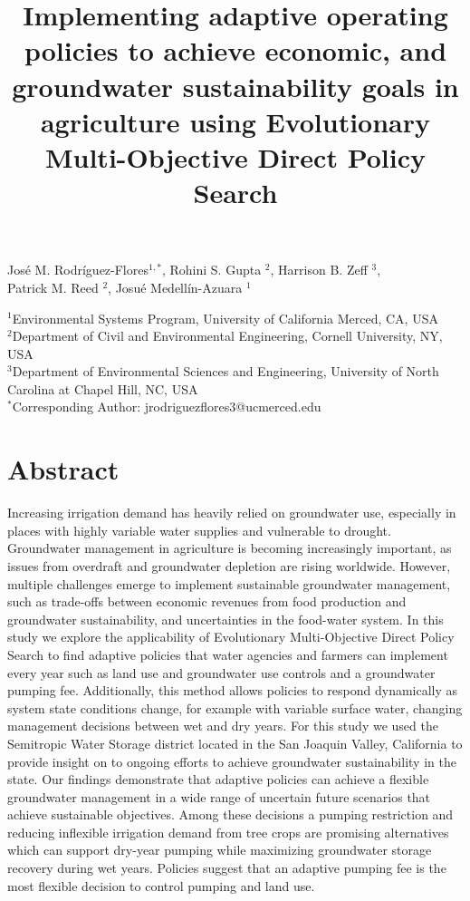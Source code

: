 \documentclass[11pt,a4paper]{article}
\title{Implementing adaptive operating policies to achieve economic, and groundwater sustainability goals in agriculture using Evolutionary Multi-Objective Direct Policy Search}
\date{}
\begin{document}
\maketitle

\vspace{-3cm}

\begin{center}
José M. Rodríguez-Flores$^{1,*}$, Rohini S. Gupta $^2$, Harrison B. Zeff $^3$,\\ Patrick M. Reed $^2$, Josué Medellín-Azuara $^1$\\
\end{center}

\begin{center}
\small
$^1$Environmental Systems Program, University of California Merced, CA, USA\\
$^2$Department of Civil and Environmental Engineering, Cornell University, NY, USA\\
$^3$Department of Environmental Sciences and Engineering, University of North Carolina at Chapel Hill, NC, USA\\
$^*$Corresponding Author: jrodriguezflores3@ucmerced.edu
\end{center}


\section*{Abstract}

Increasing irrigation demand has heavily relied on groundwater use, especially in places with highly variable water supplies and vulnerable to drought. Groundwater management in agriculture is becoming increasingly important, as issues from overdraft and groundwater depletion are rising worldwide. However, multiple challenges emerge to implement sustainable groundwater management, such as trade-offs between economic revenues from food production and groundwater sustainability, and uncertainties in the food-water system. In this study we explore the applicability of Evolutionary Multi-Objective Direct Policy Search to find adaptive policies that water agencies and farmers can implement every year such as land use and groundwater use controls and a groundwater pumping fee. Additionally, this method allows policies to respond dynamically as system state conditions change, for example with variable surface water, changing management decisions between wet and dry years. For this study we used the Semitropic Water Storage district located in the San Joaquin Valley, California to provide insight on to ongoing efforts to achieve groundwater sustainability in the state. Our findings demonstrate that adaptive policies can achieve a flexible groundwater management in a wide range of uncertain future scenarios that achieve sustainable objectives. Among these decisions a pumping restriction and reducing inflexible irrigation demand from tree crops are promising alternatives which can support dry-year pumping while maximizing groundwater storage recovery during wet years. Policies suggest that an adaptive pumping fee is the most flexible decision to control pumping and land use. 
 
\end{document}
